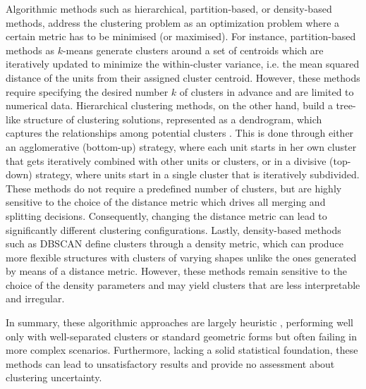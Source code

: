 \documentclass[12pt,	%
	a4paper,		%
	twoside,		%
	openright,		%
	titlepage,%
	]{book}
\theoremstyle{definition}
\let\cite\citep
\begin{document}
Algorithmic methods such as hierarchical, partition-based, or density-based methods, address the clustering problem as an optimization problem where a certain metric has to be minimised (or maximised). For instance, partition-based methods as $k$-means \cite{kmeans} generate clusters around a set of centroids which are iteratively updated to minimize the within-cluster variance, i.e. the mean squared distance of the units from their assigned cluster centroid. However, these methods require specifying the desired number $k$ of clusters in advance and are limited to numerical data.
Hierarchical clustering methods, on the other hand, build a tree-like structure of clustering solutions, represented as a dendrogram, which captures the relationships among potential clusters \cite{cl-8} \cite{cl-9}. This is done through either an agglomerative (bottom-up) strategy, where each unit starts in her own cluster that gets iteratively combined with other units or clusters, or in a divisive (top-down) strategy, where units start in a single cluster that is iteratively subdivided. These methods do not require a predefined number of clusters, but are highly sensitive to the choice of the distance metric which drives all merging and splitting decisions. Consequently, changing the distance metric can lead to significantly different clustering configurations.
Lastly, density-based methods such as DBSCAN \cite{dbscan} define clusters through a density metric, which can produce more flexible structures with clusters of varying shapes unlike the ones generated by means of a distance metric. However, these methods remain sensitive to the choice of the density parameters and may yield clusters that are less interpretable and irregular.

In summary, these algorithmic approaches are largely heuristic \cite{paper-35}, performing well only with well-separated clusters or standard geometric forms but often failing in more complex scenarios. Furthermore, lacking a solid statistical foundation, these methods can lead to unsatisfactory results and provide no assessment about clustering uncertainty.\nowidow
\end{document}
